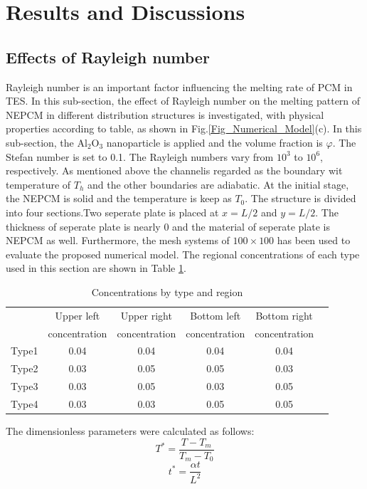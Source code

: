 \documentclass[preprint,12pt]{elsarticle}
\begin{document}
	\section{ Results and Discussions}
	\subsection{Effects of Rayleigh number}

Rayleigh number is an important factor influencing the melting rate of PCM in TES. In this sub-section, the effect of Rayleigh number on the melting pattern of NEPCM in different distribution structures is investigated, with physical properties according to table, as shown in Fig.\ref{Fig_Numerical_Model}(c). In this sub-section, the Al$_2$O$_3$ nanoparticle is applied and the volume fraction is $\varphi$. The Stefan number is set to 0.1. The Rayleigh numbers vary from $ 10^3$ to $ 10^6 $, respectively. 
As mentioned above the channelis regarded as the boundary wit temperature of $T_h$ and the other boundaries are adiabatic. At the initial stage, the NEPCM is solid and the temperature is keep as $T_0$. 
The structure is divided into four sections.Two seperate plate is placed at $x=L/2$ and $y=L/2$. 
The thickness of seperate plate is nearly 0 and the material of seperate plate is NEPCM as well. Furthermore, the mesh systems of $ 100 \times 100 $ has been used to evaluate the proposed numerical model.
The regional concentrations of each type used in this section are shown in Table \ref{type}.

\begin{table}[H]
	\centering
	\footnotesize
	\caption{Concentrations by type and region}
	\begin{tabular}{cccccc}
		\toprule
		& Upper left  & Upper right  & Bottom left  & Bottom right  \\
		& concentration  & concentration  & concentration  & concentration  \\
		\midrule
		Type1 & 0.04 & 0.04  & 0.04   & 0.04   \\
		Type2 & 0.03 & 0.05  & 0.05   & 0.03   \\
		Type3 & 0.03 & 0.05  & 0.03   & 0.05   \\
		Type4 & 0.03 & 0.03  & 0.05   & 0.05   \\
		\bottomrule
	\end{tabular}
	\label{type}		
\end{table}
The dimensionless parameters were calculated as follows:
\begin{equation}
	T^*=\frac{T-T_m}{T_m-T_0}
\end{equation}
\begin{equation}
	t^{*}=\frac{\alpha t}{L^{2}}
\end{equation}
\end{document}
